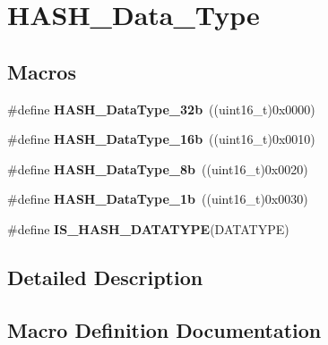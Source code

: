 \hypertarget{group___h_a_s_h___data___type}{}\section{H\+A\+S\+H\+\_\+\+Data\+\_\+\+Type}
\label{group___h_a_s_h___data___type}
\subsection*{Macros}
\begin{DoxyCompactItemize}
\item 
\hypertarget{group___h_a_s_h___data___type_ga1eb75a90b73558a3ed936aabc518389f}{}\#define {\bfseries H\+A\+S\+H\+\_\+\+Data\+Type\+\_\+32b}~((uint16\+\_\+t)0x0000)\label{group___h_a_s_h___data___type_ga1eb75a90b73558a3ed936aabc518389f}

\item 
\hypertarget{group___h_a_s_h___data___type_ga07a0a06c7076fab096f1cc4ae66bcad8}{}\#define {\bfseries H\+A\+S\+H\+\_\+\+Data\+Type\+\_\+16b}~((uint16\+\_\+t)0x0010)\label{group___h_a_s_h___data___type_ga07a0a06c7076fab096f1cc4ae66bcad8}

\item 
\hypertarget{group___h_a_s_h___data___type_ga82d37dec3af7193f8e665615108011a9}{}\#define {\bfseries H\+A\+S\+H\+\_\+\+Data\+Type\+\_\+8b}~((uint16\+\_\+t)0x0020)\label{group___h_a_s_h___data___type_ga82d37dec3af7193f8e665615108011a9}

\item 
\hypertarget{group___h_a_s_h___data___type_ga52034893dfa756397af1d681960be92f}{}\#define {\bfseries H\+A\+S\+H\+\_\+\+Data\+Type\+\_\+1b}~((uint16\+\_\+t)0x0030)\label{group___h_a_s_h___data___type_ga52034893dfa756397af1d681960be92f}

\item 
\#define {\bfseries I\+S\+\_\+\+H\+A\+S\+H\+\_\+\+D\+A\+T\+A\+T\+Y\+P\+E}(D\+A\+T\+A\+T\+Y\+P\+E)
\end{DoxyCompactItemize}


\subsection{Detailed Description}


\subsection{Macro Definition Documentation}
\hypertarget{group___h_a_s_h___data___type_ga51d13da6165bc0e2075f3653881aa89a}{}

